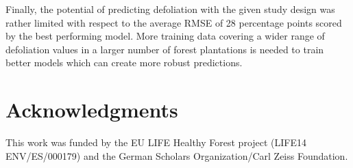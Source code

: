 \documentclass[peerreview]{IEEEtran}
\begin{document}
Finally, the potential of predicting defoliation with the given study design was rather limited with respect to the average RMSE of 28 percentage points scored by the best performing model.
More training data covering a wider range of defoliation values in a larger number of forest plantations is needed to train better models which can create more robust predictions.

\section{Acknowledgments}
This work was funded by the EU LIFE Healthy Forest project (LIFE14 ENV/ES/000179) and the German Scholars Organization/Carl Zeiss Foundation.

\appendices{}





\pagebreak
\end{document}
